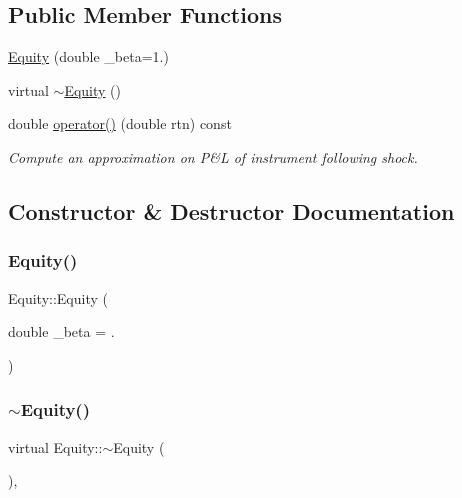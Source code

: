 \subsection*{Public Member Functions}
\begin{DoxyCompactItemize}
\item 
\hyperlink{classEquity_a3560f0e47c12a99611a97072e0a3deea}{Equity} (double \+\_\+beta=1.)
\item 
virtual \hyperlink{classEquity_af3ff4776470bcc86d607577fa947bb5b}{$\sim$\+Equity} ()
\item 
double \hyperlink{classEquity_a2844b7fa3dd164ce216909d1fe958c9f}{operator()} (double rtn) const
\begin{DoxyCompactList}\small\item\em Compute an approximation on P\&L of instrument following shock. \end{DoxyCompactList}\end{DoxyCompactItemize}


\subsection{Constructor \& Destructor Documentation}
\hypertarget{classEquity_a3560f0e47c12a99611a97072e0a3deea}{}\label{classEquity_a3560f0e47c12a99611a97072e0a3deea} 
\subsubsection{\texorpdfstring{Equity()}{Equity()}}
{\footnotesize\ttfamily Equity\+::\+Equity (\begin{DoxyParamCaption}\item[{double}]{\+\_\+beta = {.} }\end{DoxyParamCaption})}

\hypertarget{classEquity_af3ff4776470bcc86d607577fa947bb5b}{}\label{classEquity_af3ff4776470bcc86d607577fa947bb5b} 
\subsubsection{\texorpdfstring{$\sim$\+Equity()}{~Equity()}}
{\footnotesize\ttfamily virtual Equity\+::$\sim$\+Equity (\begin{DoxyParamCaption}{ }\end{DoxyParamCaption})\hspace{0.3cm}{\ttfamily [inline]}, {\ttfamily [virtual]}}



